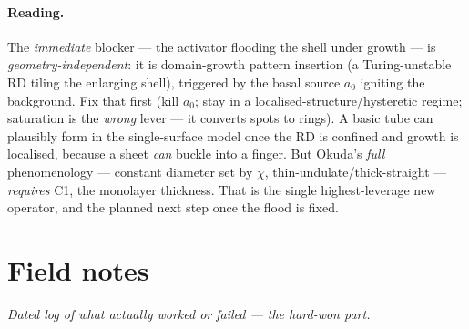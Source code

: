 \documentclass[11pt]{article}
\begin{document}
\paragraph{Reading.} The \emph{immediate} blocker --- the activator flooding the shell under growth --- is
\emph{geometry-independent}: it is domain-growth pattern insertion (a Turing-unstable RD tiling the enlarging
shell), triggered by the basal source $a_0$ igniting the background. Fix that first (kill $a_0$; stay in a
localised-structure/hysteretic regime; saturation is the \emph{wrong} lever --- it converts spots to rings).
A basic tube can plausibly form in the single-surface model once the RD is confined and growth is localised,
because a sheet \emph{can} buckle into a finger. But Okuda's \emph{full} phenomenology --- constant diameter
set by $\chi$, thin-undulate/thick-straight --- \emph{requires} C1, the monolayer thickness. That is the
single highest-leverage new operator, and the planned next step once the flood is fixed.

\section*{Field notes}
\emph{Dated log of what actually worked or failed --- the hard-won part.}
\end{document}
